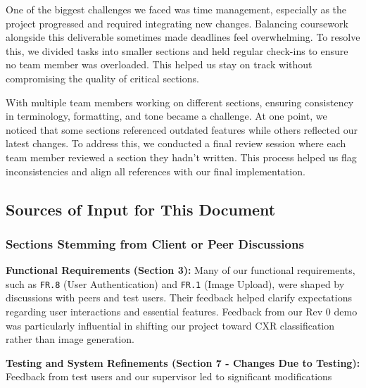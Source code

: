 \documentclass[12pt, titlepage]{article}
\begin{document}
\begin{enumerate}
  One of the biggest challenges we faced was time management, especially as the project progressed and required integrating new changes. Balancing coursework alongside this deliverable sometimes made deadlines feel overwhelming. To resolve this, we divided tasks into smaller sections and held regular check-ins to ensure no team member was overloaded. This helped us stay on track without compromising the quality of critical sections.
  
  With multiple team members working on different sections, ensuring consistency in terminology, formatting, and tone became a challenge. At one point, we noticed that some sections referenced outdated features while others reflected our latest changes. To address this, we conducted a final review session where each team member reviewed a section they hadn’t written. This process helped us flag inconsistencies and align all references with our final implementation.
  
  \subsection{Sources of Input for This Document}
  
  \subsubsection{Sections Stemming from Client or Peer Discussions}
  
  \textbf{Functional Requirements (Section 3):} Many of our functional requirements, such as \texttt{FR.8} (User Authentication) and \texttt{FR.1} (Image Upload), were shaped by discussions with peers and test users. Their feedback helped clarify expectations regarding user interactions and essential features. Feedback from our Rev 0 demo was particularly influential in shifting our project toward CXR classification rather than image generation.
  
  \textbf{Testing and System Refinements (Section 7 - Changes Due to Testing):} Feedback from test users and our supervisor led to significant modifications 
  
  

\end{enumerate}
\end{document}

